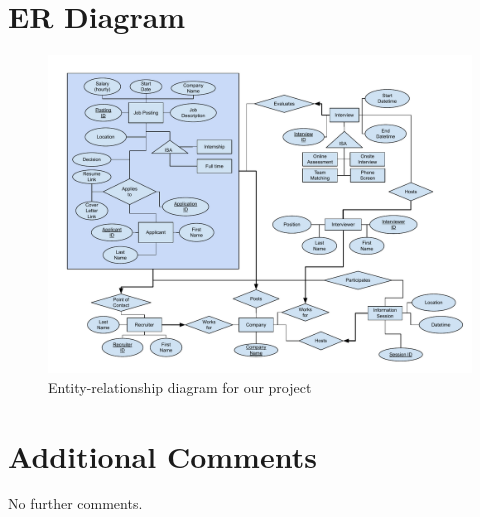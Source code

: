 \section{ER Diagram}

\begin{figure}[h]
  \caption{Entity-relationship diagram for our project}
  \includegraphics[width=\linewidth]{er diagram.pdf}
\end{figure}

\section{Additional Comments}

No further comments.

